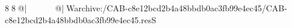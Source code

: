 8  8  @|                                                  @| W   archive:/CAB-c8e12bcd2b4a48bbdb0ac3fb99e4ec45/CAB-c8e12bcd2b4a48bbdb0ac3fb99e4ec45.resS 